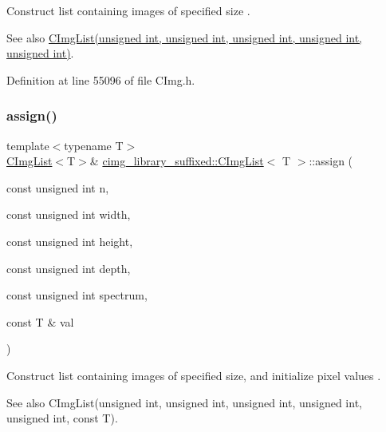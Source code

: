 Construct list containing images of specified size . 

\begin{DoxySeeAlso}{See also}
\hyperlink{structcimg__library__suffixed_1_1CImgList_a0b0ca855289f84488b25862ebc283e56}{C\+Img\+List(unsigned int, unsigned int, unsigned int, unsigned int, unsigned int)}. 
\end{DoxySeeAlso}


Definition at line 55096 of file C\+Img.\+h.

\mbox{\label{structcimg__library__suffixed_1_1CImgList_ae1b6957950d585e53e9220c488e002c2}} 
\subsubsection{\texorpdfstring{assign()}{assign()}\hspace{0.1cm}{\footnotesize\ttfamily [4/18]}}
{\footnotesize\ttfamily template$<$typename T$>$ \\
\hyperlink{structcimg__library__suffixed_1_1CImgList}{C\+Img\+List}$<$T$>$\& \hyperlink{structcimg__library__suffixed_1_1CImgList}{cimg\+\_\+library\+\_\+suffixed\+::\+C\+Img\+List}$<$ T $>$\+::assign (\begin{DoxyParamCaption}\item[{const unsigned int}]{n,  }\item[{const unsigned int}]{width,  }\item[{const unsigned int}]{height,  }\item[{const unsigned int}]{depth,  }\item[{const unsigned int}]{spectrum,  }\item[{const T \&}]{val }\end{DoxyParamCaption})\hspace{0.3cm}{\ttfamily [inline]}}



Construct list containing images of specified size, and initialize pixel values . 

\begin{DoxySeeAlso}{See also}
C\+Img\+List(unsigned int, unsigned int, unsigned int, unsigned int, unsigned int, const T). 
\end{DoxySeeAlso}


